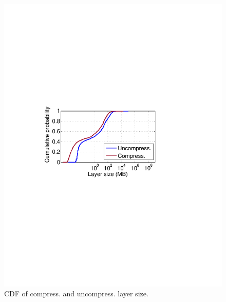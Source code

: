 \begin{figure}[t]
	\centering
	\begin{minipage}{0.32\textwidth}
		\centering
		\includegraphics[width=1\textwidth]{graphs/layer-size-cdf.pdf}
		\caption{CDF of compress. and uncompress. layer size.}
		\label{fig:layer-size-cdf}
	\end{minipage}%
\end{figure}
